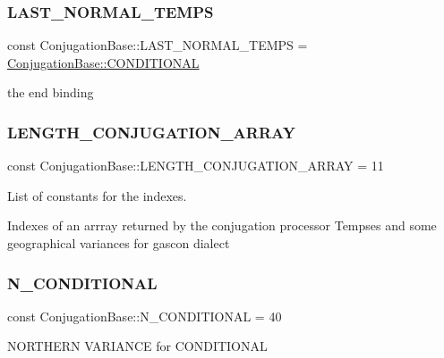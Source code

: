 \subsubsection{\texorpdfstring{L\+A\+S\+T\+\_\+\+N\+O\+R\+M\+A\+L\+\_\+\+T\+E\+M\+PS}{LAST\_NORMAL\_TEMPS}}
{\footnotesize\ttfamily const Conjugation\+Base\+::\+L\+A\+S\+T\+\_\+\+N\+O\+R\+M\+A\+L\+\_\+\+T\+E\+M\+PS = \hyperlink{class_conjugation_base_aac0359d9a8bb66ea04612b7f14d43c50}{Conjugation\+Base\+::\+C\+O\+N\+D\+I\+T\+I\+O\+N\+AL}}

the end binding \hypertarget{class_conjugation_base_aa6a9ad231bf385e0bd9e240213facf36}{}\label{class_conjugation_base_aa6a9ad231bf385e0bd9e240213facf36} 
\subsubsection{\texorpdfstring{L\+E\+N\+G\+T\+H\+\_\+\+C\+O\+N\+J\+U\+G\+A\+T\+I\+O\+N\+\_\+\+A\+R\+R\+AY}{LENGTH\_CONJUGATION\_ARRAY}}
{\footnotesize\ttfamily const Conjugation\+Base\+::\+L\+E\+N\+G\+T\+H\+\_\+\+C\+O\+N\+J\+U\+G\+A\+T\+I\+O\+N\+\_\+\+A\+R\+R\+AY = 11}



List of constants for the indexes. 

Indexes of an arrray returned by the conjugation processor Tempses and some geographical variances for gascon dialect \hypertarget{class_conjugation_base_a66898e8176a1e2c5aacad8657b90df08}{}\label{class_conjugation_base_a66898e8176a1e2c5aacad8657b90df08} 
\subsubsection{\texorpdfstring{N\+\_\+\+C\+O\+N\+D\+I\+T\+I\+O\+N\+AL}{N\_CONDITIONAL}}
{\footnotesize\ttfamily const Conjugation\+Base\+::\+N\+\_\+\+C\+O\+N\+D\+I\+T\+I\+O\+N\+AL = 40}

N\+O\+R\+T\+H\+E\+RN V\+A\+R\+I\+A\+N\+CE for C\+O\+N\+D\+I\+T\+I\+O\+N\+AL \hypertarget{class_conjugation_base_a109b61ea3f44b885131acc8cd2cc1041}{}\label{class_conjugation_base_a109b61ea3f44b885131acc8cd2cc1041} 
